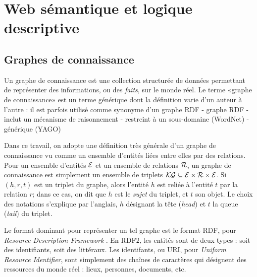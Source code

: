 \label{chap:revue}


\section{Web sémantique et logique descriptive}
\label{sec:dl}

\subsection{Graphes de connaissance}




Un graphe de connaissance est une collection structurée de données permettant de représenter des informations, ou des \textit{faits}, sur le monde réel. Le terme «graphe de connaissance» est un terme générique dont la définition varie d'un auteur à l'autre \cite{ehrlinger2016towards} : il est parfois utilisé comme synonyme d'un graphe RDF
- graphe RDF
- inclut un mécanisme de raisonnement
- restreint à un sous-domaine (WordNet)
- générique (YAGO)


Dans ce travail, on adopte une définition très générale d'un graphe de connaissance vu comme un ensemble d'entités liées entre elles par des relations. Pour un ensemble d'entités $\mathcal{E}$ et un ensemble de relations $\mathcal{R}$, un graphe de connaissance est simplement un ensemble de triplets $\mathcal{KG} \subseteq \mathcal{E} \times \mathcal{R} \times \mathcal{E}$. Si $(h, r, t)$ est un triplet du graphe, alors l'entité $h$ est reliée à l'entité $t$ par la relation $r$; dans ce cas, on dit que $h$ est le \textit{sujet} du triplet, et $t$ son objet. Le choix des notations s'explique par l'anglais, $h$ désignant la tête (\textit{head}) et $t$ la queue (\textit{tail}) du triplet. 

Le format dominant pour représenter un tel graphe est le format RDF, pour \textit{Resource Description Framework} \cite{cyganiak14}. En RDF2, les entités sont de deux types : soit des identifiants, soit des littéraux. Les identifants, ou URI, pour \textit{Uniform Resource Identifier}, sont simplement des chaînes de caractères qui désignent des ressources du monde réel : lieux, personnes, documents, etc. %



